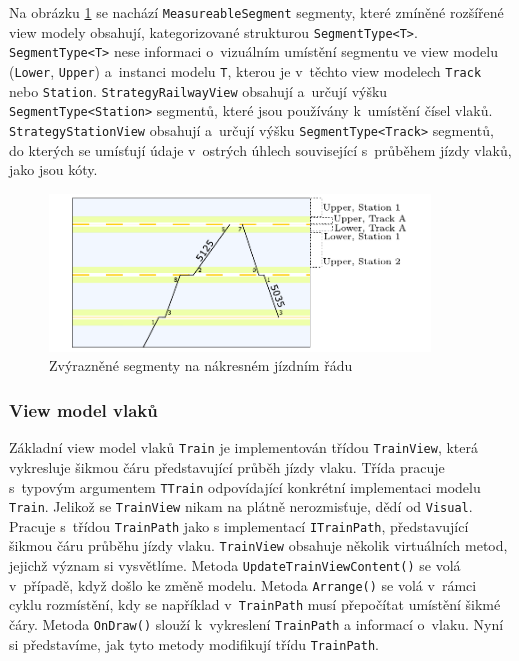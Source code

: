 Na obrázku \ref{fig:kap4:gttg-core-view-model-infrastructure-strategy} se nachází \texttt{MeasureableSegment} segmenty, které zmíněné rozšířené view modely obsahují, kategorizované strukturou \texttt{SegmentType<T>}. \linebreak \texttt{SegmentType<T>} nese informaci o~vizuálním umístění segmentu ve view modelu (\texttt{Lower}, \texttt{Upper}) a~instanci modelu \texttt{T}, kterou je v~těchto view modelech \texttt{Track} nebo \texttt{Station}. \texttt{StrategyRailwayView} obsahují a~určují výšku \texttt{SegmentType<Station>} segmentů, které jsou používány k~umístění čísel vlaků. \texttt{StrategyStationView} obsahují a~určují výšku \texttt{SegmentType<Track>} segmentů, do kterých se umísťují údaje v~ostrých úhlech související s~průběhem jízdy vlaků, jako jsou kóty.

\begin{figure}[!hbt]
	\includegraphics[width=0.9\textwidth]{../img/kap4_gttg-core-view-model-infrastructure-strategy}
	\caption{Zvýrazněné segmenty na nákresném jízdním řádu}
	\label{fig:kap4:gttg-core-view-model-infrastructure-strategy}
\end{figure}
\newpage
\subsubsection*{View model vlaků}
Základní view model vlaků \texttt{Train} je implementován třídou \texttt{TrainView}, která vykresluje šikmou čáru představující průběh jízdy vlaku. Třída pracuje s~typovým  argumentem \texttt{TTrain} odpovídající konkrétní implementaci modelu \texttt{Train}. Jelikož se \texttt{TrainView} nikam na plátně nerozmisťuje, dědí od \texttt{Visual}. Pracuje s~třídou \texttt{TrainPath} jako s implementací \texttt{ITrainPath}, představující šikmou čáru průběhu jízdy vlaku. \texttt{TrainView} obsahuje několik virtuálních metod, jejichž význam si vysvětlíme. Metoda \texttt{UpdateTrainViewContent()} se volá v~případě, když došlo ke změně modelu. Metoda \texttt{Arrange()} se volá v~rámci cyklu rozmístění, kdy se například v~\texttt{TrainPath} musí přepočítat umístění šikmé čáry. Metoda \texttt{OnDraw()} slouží k~vykreslení \texttt{TrainPath} a informací o~vlaku. Nyní si představíme, jak tyto metody modifikují třídu \texttt{TrainPath}.

